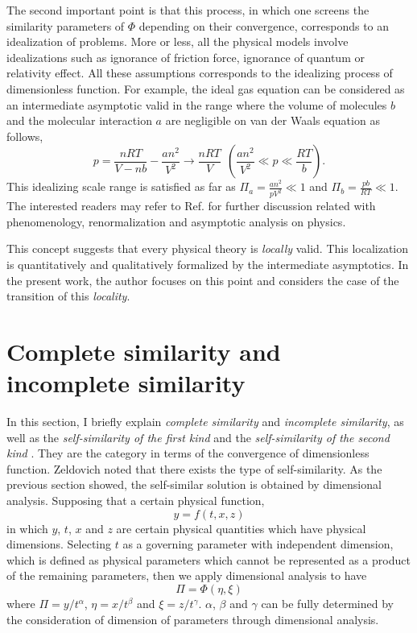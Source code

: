 \documentclass[aps,prl,superscriptaddress]{revtex4}  %
\begin{document}
The second important point is that this process, in which one screens the similarity parameters of $\Phi$ depending on their convergence, corresponds to an idealization of problems. More or less, all the physical models involve idealizations such as ignorance of friction force, ignorance of quantum or relativity effect. All these assumptions corresponds to the idealizing process of dimensionless function. For example, the ideal gas equation can be considered as an intermediate asymptotic valid in the range where the volume of molecules $b$ and the molecular interaction $a$ are negligible on van der Waals equation as follows,
\begin{equation}
p=\frac{nRT}{V-nb}-\frac{an^2}{V^2} \longrightarrow \frac{nRT}{V}~~\left(\frac{an^2}{V^2} \ll p \ll \frac{RT}{b} \right).
\label{eq:ES5}
\end{equation}
This idealizing scale range is satisfied as far as $\Pi_a = \frac{a n^2}{pV^2} \ll 1$ and $\Pi_b = \frac{pb}{RT} \ll 1$. The interested readers may refer to Ref.\cite{Oono2013} for further discussion related with phenomenology, renormalization and asymptotic analysis on physics.

This concept suggests that every physical theory is {\it locally} valid. This localization is quantitatively and qualitatively formalized by the intermediate asymptotics. In the present work, the author focuses on this point and considers the case of the transition of this {\it locality}.

\section{Complete similarity and incomplete similarity}

In this section, I briefly explain {\it complete similarity} and {\it incomplete similarity}, as well as the {\it self-similarity of the first kind} and the {\it self-similarity of the second kind} \cite{SecondKind}. They are the category in terms of the convergence of dimensionless function. Zeldovich noted that there exists the type of self-similarity\cite{Zeldovich1956}. As the previous section showed, the self-similar solution is obtained by dimensional analysis. Supposing that a certain physical function, 
%
\begin{equation}
y = f(t,x,z)
\label{eq:ES6}
\end{equation}
%
in which $y$, $t$, $x$ and $z$ are certain physical quantities which have physical dimensions. Selecting $t$ as a governing parameter with independent dimension, which is defined as physical parameters which cannot be represented as a product of the remaining parameters, then we apply dimensional analysis to have
%
\begin{equation}
\Pi = \Phi(\eta, \xi)
\label{eq:ES7}
\end{equation}
%
where $\Pi = y/t^{\alpha}$, $\eta = x/t^{\beta}$ and $\xi = z/t^{\gamma}$. $\alpha$, $\beta$ and $\gamma$ can be fully determined by the consideration of dimension of parameters through dimensional analysis.
\end{document}
